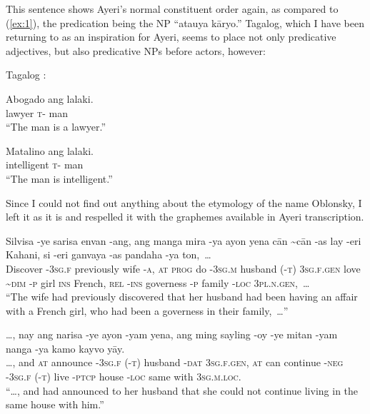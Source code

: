 \documentclass[12pt,paper=letter]{scrartcl}
\newcommand{\q}[1]{\enquote{#1}} %
\newcommand{\divider}{
    \vspace{\baselineskip}
}
\newcommand{\mor}[1]{\textsc{\lowercase{#1}}}
\begin{document}
This sentence shows Ayeri's normal constituent order again, as compared to 
(\ref{ex:1}), the predication being the NP \q{atauya kāryo.} Tagalog,
which I have been returning to as an inspiration for Ayeri, seems to place 
not only predicative adjectives, but also predicative NPs before actors, however:

\begin{exe}
     Tagalog \autocite[499]{schachter}:
    \begin{xlist}
	\ex
	\gll Abogado ang lalaki. \\
	lawyer \mor{T-} man \\
	\glt \q{The man is a lawyer.}
	
	\ex
	\gll Matalino ang lalaki. \\
	intelligent \mor{T-} man \\
	\glt \q{The man is intelligent.}
    \end{xlist}
\end{exe}

Since I could not find out anything about the etymology of the name Oblonsky,
I left it as it is and respelled it with the graphemes available in Ayeri 
transcription.

\divider

\begin{exe} %
    \ex \label{ex:3}
    \begin{xlist}
	\ex \gll Silvisa -ye sarisa envan -ang, ang manga mira -ya ayon {} yena 
	    cān \textasciitilde{}cān -as lay -eri Kahani, si -eri ganvaya -as 
	    pandaha -ya ton,~… \\
	Discover \mor{-3SG.F} previously wife \mor{-A}, \mor{AT} \mor{PROG} do
	    \mor{-3SG.M} husband \mor{(-T)} \mor{3SG.F.GEN} love 
	    \mor{\textasciitilde{}DIM} \mor{-P} girl \mor{INS} French, 
	    \mor{REL} \mor{-INS} governess \mor{-P} family \mor{-LOC} 
	    \mor{3PL.N.GEN},~… \\
	\glt \q{The wife had previously discovered that her husband
	    had been having an affair with a French girl, who had been a
	    governess in their family,~…}
	
	\ex \gll …, nay ang narisa -ye {} ayon -yam yena, ang ming sayling -oy 
	    -ye {} mitan -yam nanga -ya kamo kayvo yāy. \\
	…, and \mor{AT} announce \mor{-3SG.F} \mor{(-T)} husband \mor{-DAT}
	    \mor{3SG.F.GEN}, \mor{AT} can continue \mor{-NEG} \mor{-3SG.F} 
	    \mor{(-T)} live \mor{-PTCP} house \mor{-LOC} same with 
	    \mor{3SG.M.LOC}. \\
	\glt \q{…, and had announced to her husband that she could not 
	    continue living in the same house with him.}
    \end{xlist}
\end{exe}
\end{document}
